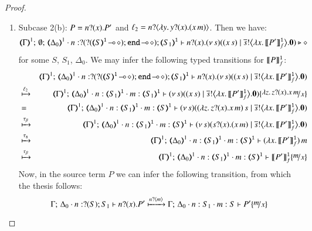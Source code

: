 \begin{proof}
\begin{enumerate}[1.]
	\item	Subcase 2(b): $P = n ? (x) . P'$ and $\ell_2 = n ? \langle \lambda y.\,y ? (x) . (x\, {m}) \rangle$.
		Then we have:
%
		\[
			\mapt{\Gamma}^{1};\, \emptyset;\, \mapt{\Delta_0}^{1} \cat 
			n: \btinp{\lhot{\btinp{\lhot{\tmap{S}{1}}}\tinact}} \tmap{S_1}{1}
			\proves
			\binp{n}{x} \newsp{s}{(\appl{x}{s})
			\Par 
			\bbout{\dual{s}}{\abs{x}{\pmapp{P'}{1}{f}}} \inact}
			\hastype \Proc
		\]
%
		for some $S$, $S_1$, $\Delta_0$.
		We may infer the following typed transitions for $\llbracket P\rrbracket^\mathtt{1}_f$:
%
		\begin{eqnarray*}
			& & 
			\mapt{\Gamma}^{1};\, %
			\mapt{\Delta_0}^{1} \cat 
			n: \btinp{\lhot{\btinp{\lhot{\tmap{S}{1}}}\tinact}} \tmap{S_1}{1}
			\proves
			\binp{n}{x} \newsp{s}{(\appl{x}{s}) 
							\Par 
							\bbout{\dual{s}}{\abs{x}{\pmapp{P'}{1}{f}}} \inact} \\
			& \hby{\ell_2} & 
			\mapt{\Gamma}^{1};\, %
			\mapt{\Delta_0}^{1} \cat 
			n:\tmap{S_1}{1}
			\cat m:\tmap{S_1}{1}
			\proves
			\newsp{s}{(\appl{x}{s}) 
				\Par 
				\bbout{\dual{s}}{\abs{x}{\pmapp{P'}{1}{f}}} \inact} \subst{\abs{z}\binp{z}{x}\appl{x}{m}}{x} \\
			& = & 
			\mapt{\Gamma}^{1};\, %
			\mapt{\Delta_0}^{1} 
			\cat n:\tmap{S_1}{1}
			\cat m:\tmap{S}{1}
			\proves
			\newsp{s}{\appl{(\abs{z}\binp{z}{x}\appl{x}{m})}{s}
				\Par 
				\bbout{\dual{s}}{\abs{x}{\pmapp{P'}{1}{f}}} \inact}  
				\\
			& \hby{\btau} & 
			\mapt{\Gamma}^{1};\, %
			\mapt{\Delta_0}^{1} 
			\cat n:\tmap{S_1}{1}
			\cat m:\tmap{S}{1}
			\proves
			\newsp{s}{\binp{s}{x}(\appl{x}{m}) 
				\Par 
				\bbout{\dual{s}}{\abs{x}{\pmapp{P'}{1}{f}}} \inact}  
				\\
			& \hby{\stau} & 
			\mapt{\Gamma}^{1};\, %
			\mapt{\Delta_0}^{1} 
			\cat n:\tmap{S_1}{1}
			\cat m:\tmap{S}{1}
			\proves
			\appl{(\abs{x}{\pmapp{P'}{1}{f}})}{m}   \\
			& \hby{\btau} & 
			\mapt{\Gamma}^{1};\, %
			\mapt{\Delta_0}^{1} 
			\cat n:\tmap{S_1}{1}
			\cat m:\tmap{S}{1}
			\proves
			\pmapp{P'}{1}{f}\subst{m}{x}   
		\end{eqnarray*}
%
		Now, in the source term $P$ we can infer the following transition, from which the thesis follows:
%
		\[
			\Gamma;\,  \Delta_0 \cat n:\btinp{S} S_1 \proves \binp{n}{x} P'
			\hby{\bactinp{n}{m}} 
			\Gamma;\,  \Delta_0 \cat n: S_1 \cat m: S \proves P'\subst{m}{x}
		\]
\end{enumerate}
\end{proof}


